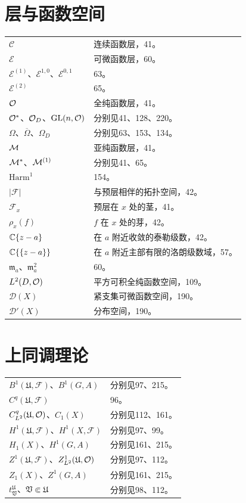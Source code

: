 \section*{层与函数空间}
\begin{longtable}{p{}p{}}
$\mathcal C$ & 连续函数层，41。\\
$\mathcal E$ & 可微函数层，60。\\
$\mathcal E^{(1)}$、$\mathcal E^{1,0}$、$\mathcal E^{0,1}$ & 63。\\
$\mathcal E^{(2)}$ & 65。\\
$\mathcal O$ & 全纯函数层，41。\\
$\mathcal O^*$、$\mathcal O_D$、$\mathrm{GL}(n,\mathcal O)$ & 分别见41、128、220。\\
$\Omega$、$\overline\Omega$、$\Omega_D$ & 分别见63、153、134。\\
$\mathcal M$ & 亚纯函数层，41。\\
$\mathcal M^*$、$\mathcal M^{(1)}$ & 分别见41、65。\\
$\mathrm{Harm}^1$ & 154。\\
$|\mathcal F|$ & 与预层相伴的拓扑空间，42。\\
$\mathcal F_x$ & 预层在 $x$ 处的茎，41。\\
$\rho_x(f)$ & $f$ 在 $x$ 处的芽，42。\\
$\mathbb C\{z-a\}$ & 在 $a$ 附近收敛的泰勒级数，42。\\
$\mathbb C\{\{z-a\}\}$ & 在 $a$ 附近主部有限的洛朗级数域，57。\\
$\mathfrak m_a$、$\mathfrak m_a^2$ & 60。\\
$L^2(D,\mathcal O)$ & 平方可积全纯函数空间，109。\\
$\mathcal D(X)$ & 紧支集可微函数空间，190。\\
$\mathcal D'(X)$ & 分布空间，190。\\
\end{longtable}
\section*{上同调理论}
\begin{longtable}{p{}p{}}
$B^1(\mathfrak U,\mathcal F)$、$B^1(G,A)$ & 分别见97、215。\\
$C^q(\mathfrak U,\mathcal F)$ & 96。\\
$C^q_{L^2}(\mathfrak U,\mathcal O)$、$C_1(X)$ & 分别见112、161。\\
$H^1(\mathfrak U,\mathcal F)$、$H^1(X,\mathcal F)$ & 分别见97、99。\\
$H_1(X)$、$H^1(G,A)$ & 分别见161、215。\\
$Z^1(\mathfrak U,\mathcal F)$、$Z^1_{L^2}(\mathfrak U,\mathcal O)$ & 分别见97、112。\\
$Z_1(X)$、$Z^1(G,A)$ & 分别见161、215。\\
$t^{\mathfrak U}_{\mathfrak V}$、$\mathfrak V\Subset\mathfrak U$ & 分别见98、112。\\
\end{longtable}
